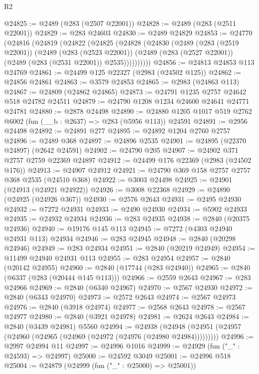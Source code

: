 \begin{lexlean}{R2}
\begin{coremodule}
@24825 := @2489 (@283 (@2507 @22001))
@24828 := @2489 (@283 (@2511 @22001))
@24829 := @283 @24603
@24830 := @2489 @24829
@24853 := @24770
    (@24816
      (@24819
        (@24822
          (@24825
            (@24828
              (@24830
                (@2489
                  (@283 (@2519 @22001))
                  (@2489
                    (@283 (@2523 @22001))
                    (@2489 (@283 (@2527 @22001)) (@2489 (@283 (@2531 @22001)) @2535))))))))))
@24856 := @24813 @24853 @113 @24769
@24861 := @24499 @125 @22327 (@2983 (@24502 @125))
@24862 := @24856 @24861
@24863 := @3579 @24853
@24865 := @2983 (@24863 @113)
@24867 := @24809 (@24862 @24865)
@24873 := @24791 @1235 @2757 @24642 @518 @24782 @24511
@24879 := @24790 @1208 @1234 @24600 @24641 @24771 @24781
@24880 := @2878 @24498
@24890 := @24880 @1205 @1017 @519 @2762 @6002 (fun (__b : @2637) => @283 (@5956 @113)) @24591
@24891 := @2956 @24498
@24892 := @24891 @277
@24895 := @24892 @1204 @2760 @2757
@24896 := @2489 @368
@24897 := @24896 @2535
@24901 := @24895 (@22370 @24897) (@2642 @24591)
@24902 := @24790 @205
@24907 := @24902 @371 @2757 @2759 @22369 @24897
@24912 := @24499 @176 @22369 (@2983 (@24502 @176))
@24913 := @24907 @24912
@24921 := @24790 @369 @158 @2757 @2757 @368 @2535 (@24510 @368)
@24922 := @3003 @24498
@24925 := @24901 (@24913 (@24921 @24922))
@24926 := @3008 @22368
@24929 := @24890 (@24925 (@24926 @367))
@24930 := @2576 @2643
@24931 := @2495 @24930
@24932 := @7272 @24931
@24933 := @2490 @24930
@24934 := @5902 @24933
@24935 := @24932 @24934
@24936 := @283 @24935
@24938 := @2840 (@20375 @24936)
@24940 := @19176 @145 @113
@24945 := @7272 (@4303 @24940 @24931 @113) @24934
@24946 := @283 @24945
@24948 := @2840 (@20298 @24946)
@24949 := @283 @24934
@24951 := @2840 (@20219 @24949)
@24954 := @11499 @24940 @24931 @113
@24955 := @283 @24954
@24957 := @2840 (@20142 @24955)
@24960 := @2840 (@17744 (@283 @24940))
@24965 := @2840 (@6337 (@283 (@20444 @145 @113)))
@24966 := @2559 @2643
@24967 := @283 @24966
@24969 := @2840 (@6340 @24967)
@24970 := @2567 @24930
@24972 := @2840 (@6343 @24970)
@24973 := @2572 @2643
@24974 := @2567 @24973
@24976 := @2840 (@3918 @24974)
@24977 := @2568 @2643
@24978 := @2567 @24977
@24980 := @2840 (@3921 @24978)
@24981 := @2624 @2643
@24984 := @2840 (@3439 @24981) @5560
@24994 := @24938
    (@24948 (@24951 (@24957 (@24960 (@24965 (@24969 (@24972 (@24976 (@24980 @24984)))))))))
@24996 := @2997 @24994 @11
@24997 := @24996 @1016
@24999 := @24929 (fun ("_" : @24593) => @24997)
@25000 := @24592 @3049
@25001 := @24996 @518
@25004 := @24879 (@24999 (fun ("_" : @25000) => @25001))

\end{coremodule}
\end{lexlean}
